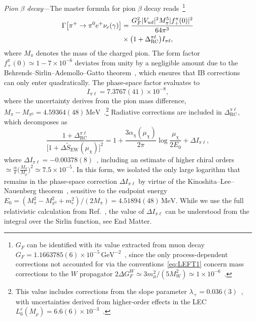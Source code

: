 \documentclass[prl,twocolumn,twoside,preprintnumbers,superscriptaddress,nofootinbib,letterpaper]{revtex4-1}
\newcommand{\GeV}{\,\text{GeV}}
\newcommand{\MeV}{\,\text{MeV}}
\newcommand{\mpi}{M_\pi}
\newcommand{\beq}{\begin{equation}}
\newcommand{\eeq}{\end{equation}}
\begin{document}
\emph{Pion $\beta$ decay}---The master formula for pion $\beta$ decay reads~\cite{Cirigliano:2002ng,Czarnecki:2019iwz}\footnote{$G_F$ can be identified with its value extracted from muon decay $G_F=1.1663785(6)\times 10^{-5}\GeV^{-2}$~\cite{ParticleDataGroup:2026,MuLan:2012sih}, since the only process-dependent corrections not accounted for via the conventions~\eqref{eq:LEFT1} concern mass corrections to the $W$ propagator $2\Delta G_F^W\simeq 3m_\mu^2/(5M_W^2)\simeq 1\times 10^{-6}$~\cite{Ferroglia:2013dga,Fael:2013pja}.}
\begin{align}
\Gamma\big[\pi^+\to\pi^0 e^+\nu_e(\gamma)\big]&=
\frac{G_F^2|V_{ud}|^2\mpi^5|f_+^\pi(0)|^2}{64\pi^3}\notag\\
&\times\big(1+\Delta_\text{RC}^{\pi\ell}\big)I_{\pi\ell},
\end{align}
where $\mpi$ denotes the mass of the charged pion. The form factor $f_+^\pi(0)\simeq 1-7\times 10^{-6}$ deviates from unity by a negligible amount due to the Behrends--Sirlin--Ademollo--Gatto theorem~\cite{Behrends:1960nf,Ademollo:1964sr,Gasser:1984ux}, which ensures that IB corrections can only enter quadratically. The phase-space factor evaluates to
\beq
\label{phase_space}
I_{\pi\ell}=7.3767(41)\times 10^{-8},
\eeq
where the uncertainty derives from the pion mass difference, $\mpi-M_{\pi^0}=4.59364(48)\MeV$~\cite{Crawford:1990jc}.\footnote{This value includes corrections from the slope parameter $\lambda_+=0.036(3)$~\cite{Gasser:1984ux}, with uncertainties derived from higher-order effects in the LEC $L_6^r(M_\rho)=6.6(6)\times 10^{-3}$~\cite{Gasser:1984gg,Bijnens:2002hp,Colangelo:2021moe}.} Radiative corrections are included in $\Delta_\text{RC}^{\pi\ell}$, which decomposes as
\beq
\label{Delta_RC_def}
\frac{1+\Delta_\text{RC}^{\pi\ell}}{\big[1+\Delta \tilde S_\text{EW}(\mu_\chi)\big]^2}
=1+
\frac{3\alpha_\chi(\mu_\chi)}{2\pi}\log\frac{\mu_\chi}{2E_0}+\Delta I_{\pi\ell},
\eeq
where $\Delta I_{\pi\ell}=-0.00378(8)$~\cite{Cirigliano:2002ng}, including an estimate of higher chiral orders $\simeq\frac{\alpha}{\pi}\big(\frac{\mpi}{M_\rho}\big)^2\simeq 7.5\times 10^{-5}$.
In this form, we isolated the only large logarithm that remains in
 the phase-space correction $\Delta I_{\pi\ell}$ by virtue of the Kinoshita--Lee--Nauenberg theorem~\cite{Passera:2011ae,Kinoshita:1962ur,Lee:1964is}, sensitive to the endpoint energy
$E_0=(\mpi^2-M_{\pi^0}^2+m_e^2)/(2\mpi)=4.51894(48)\MeV$.
While we use the full relativistic calculation from Ref.~\cite{Cirigliano:2002ng}, the value of $\Delta I_{\pi\ell}$ can be understood from the integral over the Sirlin function, see End Matter.
\end{document}
